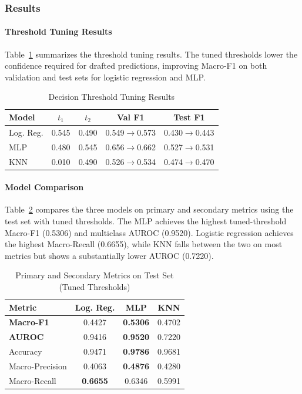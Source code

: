 \subsubsection{Results}

\paragraph{Threshold Tuning Results}
Table~\ref{tab:thresholds} summarizes the threshold tuning results. The tuned thresholds lower the confidence required for drafted predictions, improving Macro-F1 on both validation and test sets for logistic regression and MLP.

\begin{table}[h]
\caption{Decision Threshold Tuning Results}
\label{tab:thresholds}
\centering
\small
\begin{tabular}{|l|c|c|c|c|}
\hline
\textbf{Model} & $t_1$ & $t_2$ & \textbf{Val F1} & \textbf{Test F1} \\
\hline
Log. Reg. & 0.545 & 0.490 & 0.549$\to$0.573 & 0.430$\to$0.443 \\
\hline
MLP & 0.480 & 0.545 & 0.656$\to$0.662 & 0.527$\to$0.531 \\
\hline
KNN & 0.010 & 0.490 & 0.526$\to$0.534 & 0.474$\to$0.470 \\
\hline
\end{tabular}
\end{table}

\paragraph{Model Comparison}
Table~\ref{tab:primary_metrics} compares the three models on primary and secondary metrics using the test set with tuned thresholds. The MLP achieves the highest tuned-threshold Macro-F1 (0.5306) and multiclass AUROC (0.9520). Logistic regression achieves the highest Macro-Recall (0.6655), while KNN falls between the two on most metrics but shows a substantially lower AUROC (0.7220).

\begin{table}[h]
\caption{Primary and Secondary Metrics on Test Set (Tuned Thresholds)}
\label{tab:primary_metrics}
\centering
\small
\begin{tabular}{|l|c|c|c|}
\hline
\textbf{Metric} & \textbf{Log. Reg.} & \textbf{MLP} & \textbf{KNN} \\
\hline
\textbf{Macro-F1} & 0.4427 & \textbf{0.5306} & 0.4702 \\
\hline
\textbf{AUROC} & 0.9416 & \textbf{0.9520} & 0.7220 \\
\hline
Accuracy & 0.9471 & \textbf{0.9786} & 0.9681 \\
\hline
Macro-Precision & 0.4063 & \textbf{0.4876} & 0.4280 \\
\hline
Macro-Recall & \textbf{0.6655} & 0.6346 & 0.5991 \\
\hline
\end{tabular}
\end{table}

